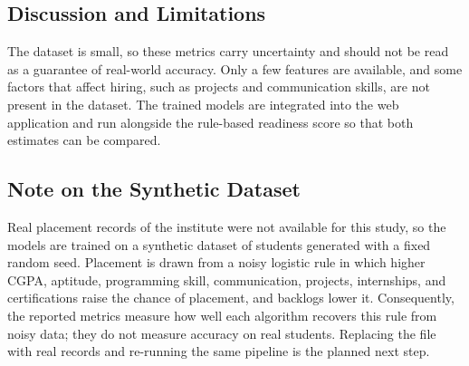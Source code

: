 \subsection{Discussion and Limitations}
The dataset is small, so these metrics carry uncertainty and should not be read as a guarantee of real-world accuracy. Only a few features are available, and some factors that affect hiring, such as projects and communication skills, are not present in the dataset. The trained models are integrated into the web application and run alongside the rule-based readiness score so that both estimates can be compared.

\ifdefined\mlSynthetic
\subsection{Note on the Synthetic Dataset}
Real placement records of the institute were not available for this study, so the models are trained on a synthetic dataset of \mlNTotal{} students generated with a fixed random seed. Placement is drawn from a noisy logistic rule in which higher CGPA, aptitude, programming skill, communication, projects, internships, and certifications raise the chance of placement, and backlogs lower it. Consequently, the reported metrics measure how well each algorithm recovers this rule from noisy data; they do not measure accuracy on real students. Replacing the file with real records and re-running the same pipeline is the planned next step.
\fi
